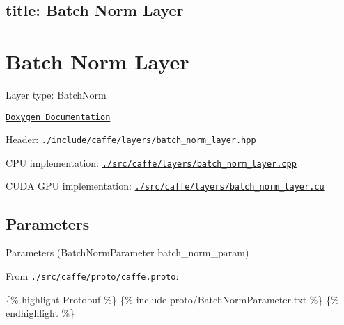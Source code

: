 

 \subsection*{title\+: Batch Norm Layer }

\section*{Batch Norm Layer}


\begin{DoxyItemize}
\item Layer type\+: {\ttfamily Batch\+Norm}
\item \href{http://caffe.berkeleyvision.org/doxygen/classcaffe_1_1BatchNormLayer.html}{\tt Doxygen Documentation}
\item Header\+: \href{https://github.com/BVLC/caffe/blob/master/include/caffe/layers/batch_norm_layer.hpp}{\tt {\ttfamily ./include/caffe/layers/batch\+\_\+norm\+\_\+layer.hpp}}
\item C\+PU implementation\+: \href{https://github.com/BVLC/caffe/blob/master/src/caffe/layers/batch_norm_layer.cpp}{\tt {\ttfamily ./src/caffe/layers/batch\+\_\+norm\+\_\+layer.cpp}}
\item C\+U\+DA G\+PU implementation\+: \href{https://github.com/BVLC/caffe/blob/master/src/caffe/layers/batch_norm_layer.cu}{\tt {\ttfamily ./src/caffe/layers/batch\+\_\+norm\+\_\+layer.cu}}
\end{DoxyItemize}

\subsection*{Parameters}


\begin{DoxyItemize}
\item Parameters ({\ttfamily Batch\+Norm\+Parameter batch\+\_\+norm\+\_\+param})
\item From \href{https://github.com/BVLC/caffe/blob/master/src/caffe/proto/caffe.proto}{\tt {\ttfamily ./src/caffe/proto/caffe.proto}}\+:
\end{DoxyItemize}

\{\% highlight Protobuf \%\} \{\% include proto/\+Batch\+Norm\+Parameter.\+txt \%\} \{\% endhighlight \%\} 